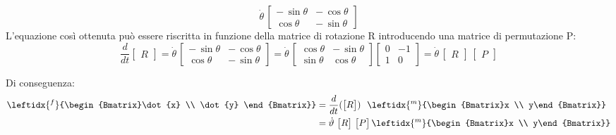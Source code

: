\begin{itemize}
\begin{itemize}
\begin{equation*}
								\dot{\theta}\,\begin{bmatrix}
									-\,\sin{\theta} & -\,\cos{\theta}\\
									\cos{\theta} & -\,\sin{\theta}
								\end{bmatrix}
						\end{equation*}
						L'equazione così ottenuta può essere riscritta in funzione della matrice di rotazione R introducendo una matrice di permutazione P:
						\begin{equation*}
							\frac{d}{dt} \begin{bmatrix}R\end{bmatrix} = \dot{\theta}\,\begin{bmatrix}
									-\,\sin{\theta} & -\,\cos{\theta}\\
									\cos{\theta} & -\,\sin{\theta}
								\end{bmatrix}
								= \dot{\theta}\,\begin{bmatrix}
										\cos{\theta} & -\,\sin{\theta}\\
										\sin{\theta} &  \cos{\theta}
								\end{bmatrix}
								\begin{bmatrix}
									0 & -1\\
									1 & 0
								\end{bmatrix}
								=  \dot{\theta}\,\begin{bmatrix}R\end{bmatrix}\, \begin{bmatrix}P\end{bmatrix}
						\end{equation*}
					\end{itemize}
					Di conseguenza:
					\begin{equation*}
						\begin{split}
							 \leftidx{^f}{\begin{Bmatrix}\dot{x} \\ \dot{y} \end{Bmatrix}} &= \frac{d}{dt}(\begin{bmatrix}R\end{bmatrix}) \quad\!\! \leftidx{^m}{\begin{Bmatrix}x \\ y\end{Bmatrix}}\\
							 &=  \dot{\theta}\,\begin{bmatrix}R\end{bmatrix}\, \begin{bmatrix}P\end{bmatrix}  \leftidx{^m}{\begin{Bmatrix}x \\ y\end{Bmatrix}}\\

\end{split}
\end{equation*}
\end{itemize}
